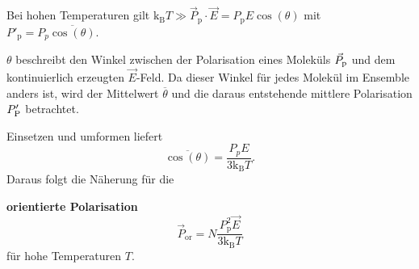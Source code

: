     Bei hohen Temperaturen gilt $\mathrm{k}_{\mathrm{B}}T\gg \vec{P}_{\text{p}}\cdot\vec{E} = P_\text{p} E \cos\left( \theta \right) $ mit $P'_{\text{p}}= P_{p} \overline{\cos\left( \theta \right) }$.
    \begin{verbal}
        $\theta$ beschreibt den Winkel zwischen der Polarisation eines Moleküls $\vec P_\text p$ und dem kontinuierlich erzeugten $\vec E$-Feld. Da dieser Winkel für jedes Molekül im Ensemble anders ist, wird der Mittelwert $\overline\theta$ und die daraus entstehende mittlere Polarisation $P_\text P'$ betrachtet.
    \end{verbal}
    Einsetzen und umformen liefert $$\overline{\cos\left( \theta \right) }= \frac{P_{p} E}{ 3 \mathrm{k}_{\mathrm{B}}T}.$$ Daraus folgt die Näherung für die 
    \begin{important}
        \textbf{orientierte Polarisation}\\
        \begin{equation}
        	{\vec{P}_{\text{or}}= N \frac{P_\text{p}^2 \vec{E}}{3 \mathrm{k}_{\text{B}}T}}
        	\label{eq:2.16}
        \end{equation}
        für hohe Temperaturen $T$.
    \end{important}
    
